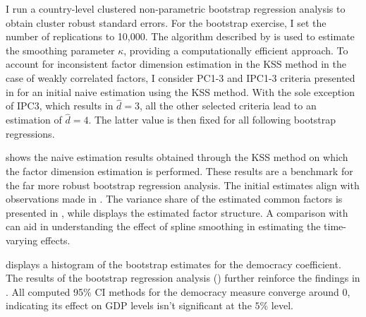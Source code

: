 \begin{appendix}
I run a country-level clustered non-parametric bootstrap regression analysis to obtain cluster robust standard errors. For the bootstrap exercise, I set the number of replications to 10,000. The algorithm described by \citet{bada2012phtt} is used to estimate the smoothing parameter $\kappa$, providing a computationally efficient approach. To account for inconsistent factor dimension estimation in the KSS method in the case of weakly correlated factors, I consider PC1-3 and IPC1-3 criteria presented in \citet{bai2002determining} for an initial naive estimation using the \ac{KSS} method. With the sole exception of IPC3, which results in $\hat{d} = 3$, all the other selected criteria lead to an estimation of $\hat{d} = 4$. The latter value is then fixed for all following bootstrap regressions.

 shows the naive estimation results obtained through the \ac{KSS} method on which the factor dimension estimation is performed. These results are a benchmark for the far more robust bootstrap regression analysis. The initial estimates align with observations made in . The variance share of the estimated common factors is presented in , while  displays the estimated factor structure. A comparison with  can aid in understanding the effect of spline smoothing in estimating the time-varying effects. 

  displays a histogram of the bootstrap estimates for the democracy coefficient. The results of the bootstrap regression analysis () further reinforce the findings in . All computed 95\% \ac{CI} methods for the democracy measure converge around 0, indicating its effect on \ac{GDP} levels isn't significant at the $5\%$ level. 



\end{appendix}
